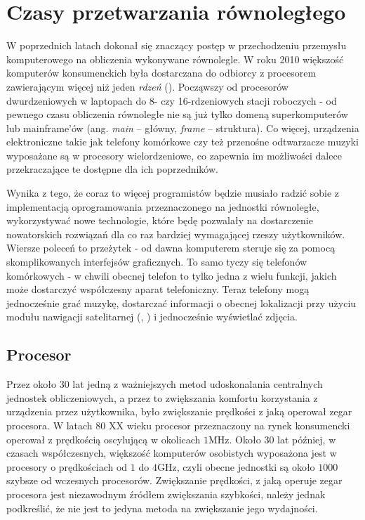 \section{Czasy przetwarzania równoległego}
W poprzednich latach dokonał się znaczący postęp w przechodzeniu przemysłu komputerowego na obliczenia wykonywane równolegle. W roku 2010 większość komputerów konsumenckich była dostarczana do odbiorcy z procesorem zawierającym więcej niż jeden \emph{rdzeń} (). Począwszy od procesorów dwurdzeniowych w laptopach do 8- czy 16-rdzeniowych stacji roboczych - od pewnego czasu obliczenia równoległe nie są już tylko domeną superkomputerów lub mainframe'ów (ang. \emph{main} – główny, \emph{frame} – struktura). Co więcej, urządzenia elektroniczne takie jak telefony komórkowe czy też przenośne odtwarzacze muzyki wyposażane są w procesory wielordzeniowe, co zapewnia im możliwości dalece przekraczające te dostępne dla ich poprzedników.

Wynika z tego, że coraz to więcej programistów będzie musiało radzić sobie z implementacją oprogramowania przeznaczonego na jednostki równoległe, wykorzystywać nowe technologie, które będę pozwalały na dostarczenie nowatorskich rozwiązań dla co raz bardziej wymagającej rzeszy użytkowników. Wiersze poleceń to przeżytek - od dawna komputerem steruje się za pomocą skomplikowanych interfejsów graficznych. To samo tyczy się telefonów komórkowych - w chwili obecnej telefon to tylko jedna z wielu funkcji, jakich może dostarczyć współczesny aparat telefoniczny. Teraz telefony mogą jednocześnie grać muzykę, dostarczać informacji o obecnej lokalizacji przy użyciu modułu nawigacji satelitarnej (, ) i jednocześnie wyświetlać zdjęcia.

\subsection{Procesor}\label{03-procesor}
Przez około 30 lat jedną z ważniejszych metod udoskonalania centralnych jednostek obliczeniowych, a przez to zwiększania komfortu korzystania z urządzenia przez użytkownika, było zwiększanie prędkości z jaką operował zegar procesora. W latach 80 XX wieku procesor przeznaczony na rynek konsumencki operował z prędkością oscylującą w okolicach $1$MHz. Około 30 lat później, w czasach współczesnych, większość komputerów osobistych wyposażona jest w procesory o prędkościach od $1$ do $4$GHz, czyli obecne jednostki są około $1000$ szybsze od wczesnych procesorów. Zwiększanie prędkości, z jaką operuje zegar procesora jest niezawodnym źródłem zwiększania szybkości, należy jednak podkreślić, że nie jest to jedyna metoda na zwiększanie jego wydajności.

